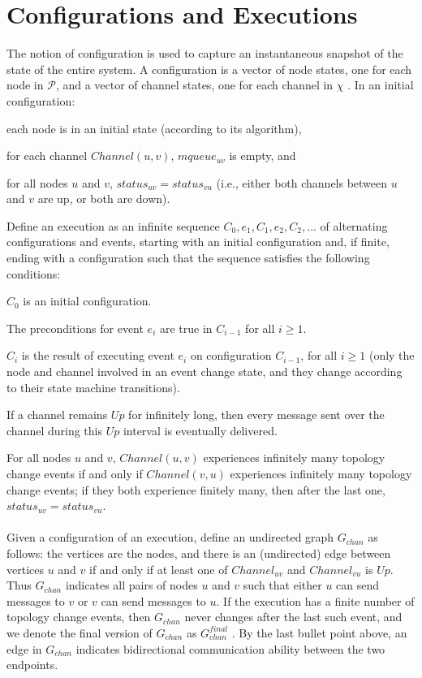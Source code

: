 \section{Configurations and Executions}
The notion of configuration is used to capture an instantaneous snapshot of the state of the entire system. A configuration is a vector of node states, one for each node in $\mathcal{P}$, and a vector of channel states, one for each channel in $\chi$ . In an initial configuration:
\begin{list}{--}{}
	\item each node is in an initial state (according to its algorithm),
	\item for each channel $Channel(u, v)$, $mqueue_{uv}$ is empty, and
	\item for all nodes $u$ and $v$, $status_{uv} = status_{vu}$ (i.e., either both channels between $u$ and $v$ are up, or both are down).
\end{list}
Define an execution as an infinite sequence $C_0, e_1 ,C_1, e_2 ,C_2,...$ of alternating configurations and events, starting with an initial configuration and, if finite, ending with a configuration such that the sequence satisfies the following conditions:
\begin{list}{--}{}
\item  $C_0$ is an initial configuration.
\item The preconditions for event $e_i$ are true in $C_{i-1}$ for all $i\geq 1$.
\item $C_i$ is the result of executing event $e_i$ on configuration $C_{i-1}$, for all $i\geq 1$ (only the node and channel involved in an event change state, and they change according to their state machine transitions).
\item If a channel remains $Up$ for infinitely long, then every message sent over the channel during this $Up$ interval is eventually delivered.
\item For all nodes $u$ and $v$, $Channel(u, v)$ experiences infinitely many topology change events if and only if $Channel(v, u)$ experiences infinitely many topology change events; if they both experience finitely many, then after the last one, $status_{uv} = status_{vu}$.
\end{list}
\paragraph{}Given a configuration of an execution, define an undirected graph $G_{chan}$ as follows: the vertices are the nodes, and there is an (undirected) edge between vertices $u$ and $v$ if and only if at least one of $Channel_{uv}$ and $Channel_{vu}$ is $Up$. Thus $G_{chan}$ indicates all pairs of nodes $u$ and $v$ such that either $u$ can send messages to $v$ or $v$ can send messages to $u$. If the execution has a finite number of topology change events, then $G_{chan}$ never changes after the last such event, and we denote the final version of $G_{chan}$ as $G_{chan} ^{final}$ . By the last bullet point above, an edge in $G_{chan}$ indicates bidirectional communication ability between the two endpoints.
